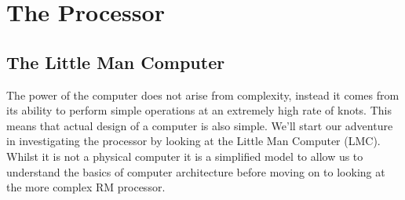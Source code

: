\chapter{The Processor}
	\section{The Little Man Computer}
		The power of the computer does not arise from complexity, instead it comes from its ability to perform simple operations at an extremely high rate of knots. This means that actual design of a computer is also simple. We'll start our adventure in investigating the processor by looking at the Little Man Computer (LMC). Whilst it is not a physical computer it is a simplified model to allow us to understand the basics of computer architecture before moving on to looking at the more complex RM processor.
		
